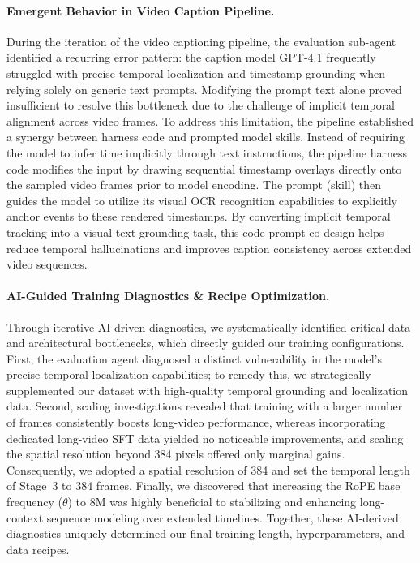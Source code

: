 \paragraph{Emergent Behavior in Video Caption Pipeline.} During the iteration of the video captioning pipeline, the evaluation sub-agent identified a recurring error pattern: the caption model GPT-4.1 frequently struggled with precise temporal localization and timestamp grounding when relying solely on generic text prompts. Modifying the prompt text alone proved insufficient to resolve this bottleneck due to the challenge of implicit temporal alignment across video frames. To address this limitation, the pipeline established a synergy between harness code and prompted model skills. Instead of requiring the model to infer time implicitly through text instructions, the pipeline harness code modifies the input by drawing sequential timestamp overlays directly onto the sampled video frames prior to model encoding. The prompt (skill) then guides the model to utilize its visual OCR recognition capabilities to explicitly anchor events to these rendered timestamps. By converting implicit temporal tracking into a visual text-grounding task, this code-prompt co-design helps reduce temporal hallucinations and improves caption consistency across extended video sequences.

\paragraph{AI-Guided Training Diagnostics \& Recipe Optimization.} Through iterative AI-driven diagnostics, we systematically identified critical data and architectural bottlenecks, which directly guided our training configurations. First, the evaluation agent diagnosed a distinct vulnerability in the model's precise temporal localization capabilities; to remedy this, we strategically supplemented our dataset with high-quality temporal grounding and localization data. Second, scaling investigations revealed that training with a larger number of frames consistently boosts long-video performance, whereas incorporating dedicated long-video SFT data yielded no noticeable improvements, and scaling the spatial resolution beyond 384 pixels offered only marginal gains. Consequently, we adopted a spatial resolution of 384 and set the temporal length of Stage~3 to 384 frames. Finally, we discovered that increasing the RoPE base frequency ($\theta$) to 8M was highly beneficial to stabilizing and enhancing long-context sequence modeling over extended timelines. Together, these AI-derived diagnostics uniquely determined our final training length, hyperparameters, and data recipes.


